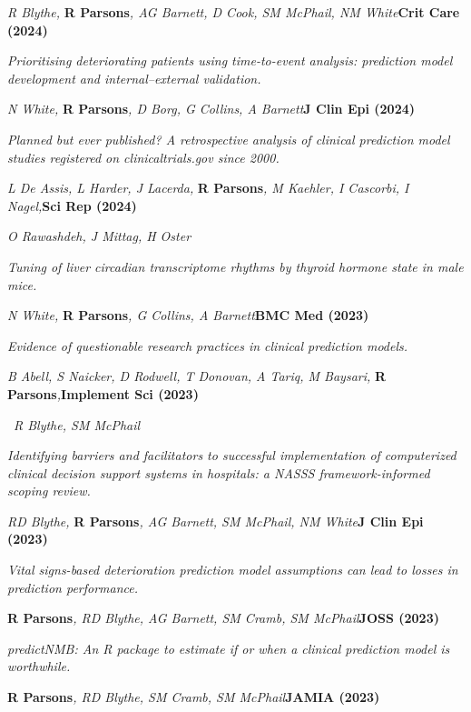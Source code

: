 \item
    \textit{R Blythe, }\textbf{R Parsons}\textit{, AG Barnett, D Cook, SM McPhail, NM White}\textbf{\hfill{Crit Care (2024)}}\par
    \textit{Prioritising deteriorating patients using time-to-event analysis: prediction model development and internal–external validation.}
\item
    \textit{N White, }\textbf{R Parsons}\textit{, D Borg, G Collins, A Barnett}\textbf{\hfill{J Clin Epi (2024)}}\par
    \textit{Planned but ever published? A retrospective analysis of clinical prediction model studies registered on clinicaltrials.gov since 2000.}
\item
	\textit{L De Assis, L Harder, J Lacerda, }\textbf{R Parsons}\textit{, M Kaehler, I Cascorbi, I Nagel,}\textbf{\hfill{Sci Rep (2024)}}\par
	\textit{O Rawashdeh, J Mittag, H Oster}\par
    \textit{Tuning of liver circadian transcriptome rhythms by thyroid hormone state in male mice.}
\item
    \textit{N White, }\textbf{R Parsons}\textit{, G Collins, A Barnett}\textbf{\hfill{BMC Med (2023)}}\par
    \textit{Evidence of questionable research practices in clinical prediction models.}
\item
    \textit{B Abell, S Naicker, D Rodwell, T Donovan, A Tariq, M Baysari, }\textbf{R Parsons}\textit{,}\textbf{\hfill{Implement Sci (2023)}}\par\
	\textit{R Blythe, SM McPhail}\par
    \textit{Identifying barriers and facilitators to successful implementation of computerized clinical decision support systems in hospitals: a NASSS framework-informed scoping review.}
\item
    \textit{RD Blythe, }\textbf{R Parsons}\textit{, AG Barnett, SM McPhail, NM White}\textbf{\hfill{J Clin Epi (2023)}}\par
    \textit{Vital signs-based deterioration prediction model assumptions can lead to losses in prediction performance.}
\item
    \textbf{R Parsons}\textit{, RD Blythe, AG Barnett, SM Cramb, SM McPhail}\textbf{\hfill{JOSS (2023)}}\par
    \textit{predictNMB: An R package to estimate if or when a clinical prediction model is worthwhile.}
\item
    \textbf{R Parsons}\textit{, RD Blythe, SM Cramb, SM McPhail}\textbf{\hfill{JAMIA (2023)}}\par

